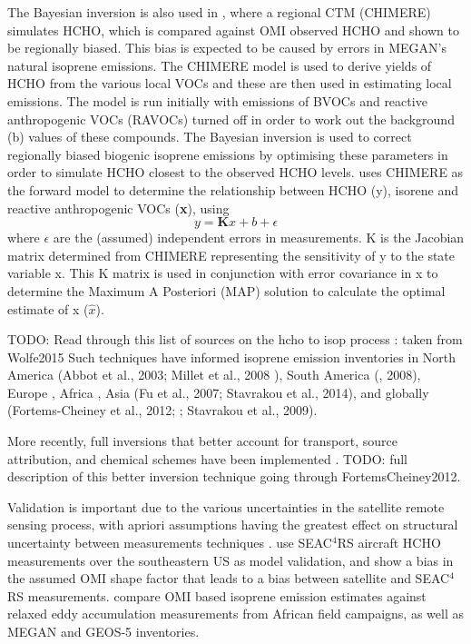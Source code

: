 	    The Bayesian inversion is also used in \citet{Curci2010}, where a regional CTM (CHIMERE) simulates HCHO, which is compared against OMI observed HCHO and shown to be regionally biased.
	    This bias is expected to be caused by errors in MEGAN's natural isoprene emissions.
	    The CHIMERE model is used to derive yields of HCHO from the various local VOCs and these are then used in estimating local emissions.
	    The model is run initially with emissions of BVOCs and reactive anthropogenic VOCs (RAVOCs) turned off in order to work out the background (b) values of these compounds.
	    The Bayesian inversion is used to correct regionally biased biogenic isoprene emissions by optimising these parameters in order to simulate HCHO closest to the observed HCHO levels.
	    \cite{Curci2010} uses CHIMERE as the forward model to determine the relationship between HCHO (y), isorene and reactive anthropogenic VOCs (\textbf{x}), using 
	    \begin{equation}
	        y=\mathbf{K}x + b + \epsilon
	    \end{equation}
	    where $\epsilon$ are the (assumed) independent errors in measurements.
	    K is the Jacobian matrix determined from CHIMERE representing the sensitivity of y to the state variable x.
	    This K matrix is used in conjunction with error covariance in x to determine the Maximum A Posteriori (MAP) solution to calculate the optimal estimate of x ($\hat{x}$).
	    
	    TODO: Read through this list of sources on the hcho to isop process : taken from Wolfe2015
	    Such techniques have informed isoprene emission inventories in North America (Abbot et al., 2003; Millet et al., 2008 \citep{Palmer2003,Millet2006,Palmer2006}), South America (\citep{Barkley2013}, 2008), Europe \citep{Curci2010,Dufour2009}, Africa \citep{Marais2012}, Asia (Fu et al., 2007; Stavrakou et al., 2014), and globally (Fortems-Cheiney et al., 2012; \citep{Shim2005}; Stavrakou et al., 2009).
	    
	    More recently, full inversions that better account for transport, source attribution, and chemical schemes have been implemented \citep{FortemsCheiney2012}.
	    TODO: full description of this better inversion technique going through FortemsCheiney2012.
	    
	    Validation is important due to the various uncertainties in the satellite remote sensing process, with apriori assumptions having the greatest effect on structural uncertainty between measurements techniques \citet{Lorente2017}.
	    \cite{Zhu2016} use SEAC$^4$RS aircraft HCHO measurements over the southeastern US as model validation, and show a bias in the assumed OMI shape factor that leads to a bias between satellite and SEAC$^4$RS measurements.
	    \cite{Marais2014} compare OMI based isoprene emission estimates against relaxed eddy accumulation measurements from African field campaigns, as well as MEGAN and GEOS-5 inventories.
	    
